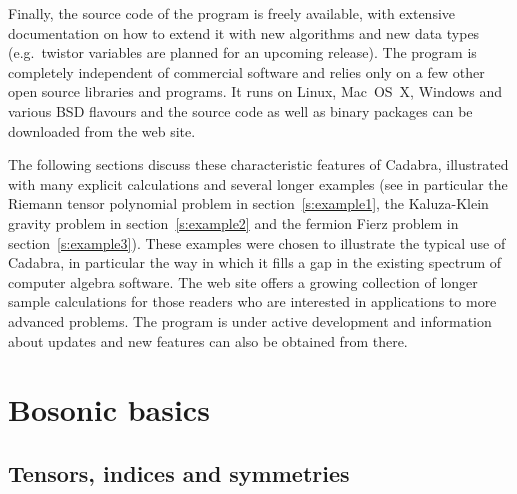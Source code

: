 \documentclass[11pt]{article}
\newcommand{\Cdb}{{Cadabra}\xspace}
\begin{document}
Finally, the source code of the program is freely available, with
extensive documentation on how to extend it with new algorithms and
new data types (e.g.~twistor variables are planned for an upcoming
release). The program is completely independent of commercial software
and relies only on a few other open source libraries and programs. It
runs on Linux, Mac~OS~X, Windows and various BSD flavours and the
source code as well as binary packages can be downloaded from the web
site.

\medskip

The following sections discuss these characteristic features of \Cdb,
illustrated with many explicit calculations and several longer
examples (see in particular the Riemann tensor polynomial problem in
section~\ref{s:example1}, the Kaluza-Klein gravity problem in
section~\ref{s:example2} and the fermion Fierz problem in
section~\ref{s:example3}). These examples were chosen to illustrate
the typical use of \Cdb, in particular the way in which it fills a gap
in the existing spectrum of computer algebra software. The web site
offers a growing collection of longer sample calculations for those
readers who are interested in applications to more advanced problems.
The program is under active development and information about updates
and new features can also be obtained from there.

\section{Bosonic basics}
\subsection{Tensors, indices and symmetries}
\end{document}
